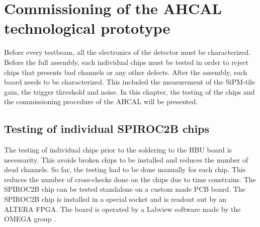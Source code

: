 \chapter{Commissioning of the AHCAL technological prototype}

Before every testbeam, all the electronics of the detector must be characterized. Before the full assembly, each individual chips must be tested in order to reject chips that presents bad channels or any other defects. After the assembly, each board needs to be characterized. This included the measurement of the SiPM-tile gain, the trigger threshold and noise. In this chapter, the testing of the chips and the commissioning procedure of the AHCAL will be presented.

\section{Testing of individual SPIROC2B chips}

The testing of individual chips prior to the soldering to the HBU board is necessarity. This avoids broken chips to be installed and reduces the number of dead channels. So far, the testing had to be done manually for each chip. This reduces the number of cross-checks done on the chips due to time constrains. The SPIROC2B chip can be tested standalone on a custom made PCB board. The SPIROC2B chip is installed in a special socket and is readout out by an ALTERA FPGA. The board is operated by a Labview software made by the OMEGA group \cite{OmegaWeb}.

